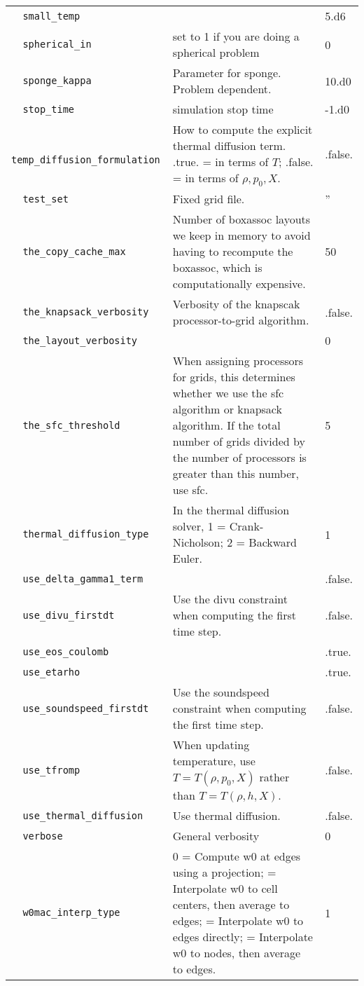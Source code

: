 {\begin{center}
\begin{longtable}{|l|p{3.25in}|l|}
\verb=  small_temp  = &    &  5.d6 \\
\verb=  spherical_in  = &   set to 1 if you are doing a spherical problem  &  0 \\
\verb=  sponge_kappa  = &   Parameter for sponge.  Problem dependent.  &  10.d0 \\
\verb=  stop_time  = &   simulation stop time  &  -1.d0 \\
\verb=  temp_diffusion_formulation  = &   How to compute the explicit thermal diffusion term.  \newline .true. = in terms of $T$; \newline .false. = in terms of $\rho,p_0,X$.  &  .false. \\
\verb=  test_set  = &   Fixed grid file.  &  '' \\
\verb=  the_copy_cache_max  = &    Number of boxassoc layouts we keep in memory to avoid having to recompute the boxassoc, which is computationally expensive.  &  50 \\
\verb=  the_knapsack_verbosity  = &   Verbosity of the knapscak processor-to-grid algorithm.  &  .false. \\
\verb=  the_layout_verbosity  = &    &  0 \\
\verb=  the_sfc_threshold  = &   When assigning processors for grids, this determines whether we use the sfc algorithm or knapsack algorithm.  If the total number of grids divided by the number of processors is greater than this number, use sfc.  &  5 \\
\verb=  thermal_diffusion_type  = &   In the thermal diffusion solver, 1 = Crank-Nicholson; 2 = Backward Euler.  &  1 \\
\verb=  use_delta_gamma1_term  = &    &  .false. \\
\verb=  use_divu_firstdt  = &   Use the divu constraint when computing the first time step.  &  .false. \\
\verb=  use_eos_coulomb  = &    &  .true. \\
\verb=  use_etarho  = &    &  .true. \\
\verb=  use_soundspeed_firstdt  = &   Use the soundspeed constraint when computing the first time step.  &  .false. \\
\verb=  use_tfromp  = &   When updating temperature, use $T=T(\rho,p_0,X) $ rather than $T=T(\rho,h,X)$.  &  .false. \\
\verb=  use_thermal_diffusion  = &   Use thermal diffusion.  &  .false. \\
\verb=  verbose  = &   General verbosity  &  0 \\
\verb=  w0mac_interp_type  = &   0 = Compute w0 at edges using a projection; \newline 1 = Interpolate w0 to cell centers, then average to edges; \newline 2 = Interpolate w0 to edges directly;                \newline 3 = Interpolate w0 to nodes, then average to edges.  &  1 \\


\end{longtable}
\end{center}

} %

%


